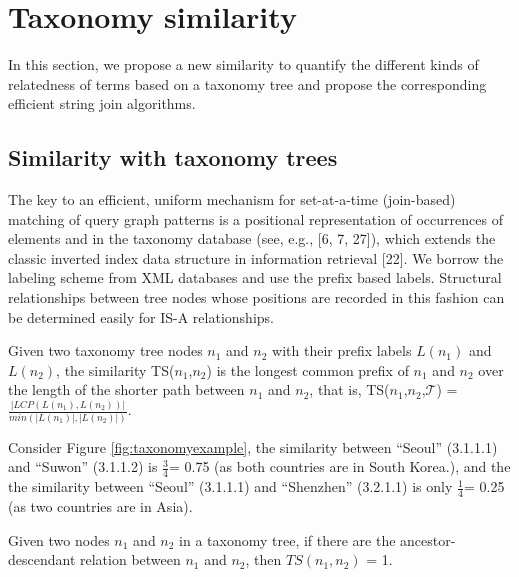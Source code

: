 \section{Taxonomy similarity}

In this section, we propose a new similarity to quantify the different kinds of relatedness of terms based on a taxonomy tree and propose the corresponding efficient string join algorithms.


\subsection{Similarity with taxonomy trees}


The key to an efficient, uniform mechanism for set-at-a-time
(join-based) matching of query graph patterns is a positional
representation of occurrences of  elements and in the taxonomy database (see, e.g., [6, 7, 27]),
which extends the classic inverted index data structure in information retrieval [22]. We borrow the labeling scheme from XML databases and use the prefix based labels. Structural relationships between tree nodes whose positions
are recorded in this fashion can be determined easily for IS-A relationships.

\smallskip
\smallskip

\begin{definition}
Given two taxonomy tree nodes $n_1$ and $n_2$ with their prefix labels $L(n_1)$ and $L(n_2)$,  the similarity TS($n_1$,$n_2$) is the longest common prefix of  $n_1$ and $n_2$ over the length of the shorter path between $n_1$ and $n_2$, that is,  TS($n_1$,$n_2$,$\mathcal{T}$) = $\frac{|LCP(L(n_1),L(n_2))|}{min(|L(n_1)|,|L(n_2)|)}$. \end{definition}

\smallskip
\smallskip


\begin{example}
Consider Figure \ref{fig:taxonomyexample}, the similarity between ``\textsf{Seoul}'' (3.1.1.1) and ``\textsf{Suwon}'' (3.1.1.2) is $\frac{3}{4}$= 0.75 (as both countries are in South Korea.), and the the similarity between ``\textsf{Seoul}''  (3.1.1.1) and ``\textsf{Shenzhen}'' (3.2.1.1) is only $\frac{1}{4}$= 0.25 (as two countries are in Asia).
\end{example}

\smallskip
\smallskip

\begin{lem} Given two nodes $n_1$ and $n_2$ in a taxonomy tree, if there are the ancestor-descendant relation between $n_1$ and $n_2$, then $TS(n_1,n_2)$ = 1.
\end{lem}

